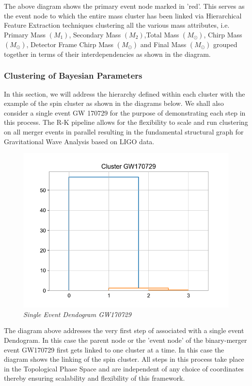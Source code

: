   The above diagram shows the primary event node marked in 'red'. This serves as the event node to which the entire mass cluster has been linked via Hierarchical Feature Extraction techniques clustering all the  various mass attributes, i.e. Primary Mass $(M_1)$, Secondary Mass $(M_2)$,Total Mass $(M_\odot)$, Chirp Mass $(M_\odot)$, Detector Frame Chirp Mass $(M_\odot)$ and Final Mass $(M_\odot)$ grouped together in terms of their interdependencies as shown in the diagram.
   
    \subsubsection{Clustering of Bayesian Parameters}
    
In this section, we will address the hierarchy defined within each cluster with the example of the spin cluster as shown in the diagrams below. We shall also consider a single event GW 170729 for the purpose of demonstrating each step in this process. The R-K pipeline allows for the flexibility to scale and run clustering on all merger events in parallel resulting in the fundamental structural graph for Gravitational Wave Analysis based on LIGO data.  


    \begin{figure}[H]
        \centering
        \includegraphics[width=1.0\linewidth]{images/57_13_GW170729 Event Based Dendogram.png}
        \caption{\textit{Single Event Dendogram GW170729}}
        \label{fig:LIGO8_PlaceHolder_fig}
    \end{figure}

The diagram above addresses the very first step of associated with a single event Dendogram. In this case the parent node or the 'event node' of the binary-merger event GW170729 first gets linked to one cluster at a time. In this case the diagram shows the linking of the spin cluster. All steps in this process take place in the Topological Phase Space and are independent of any choice of coordinates thereby ensuring scalability and flexibility of this framework.

